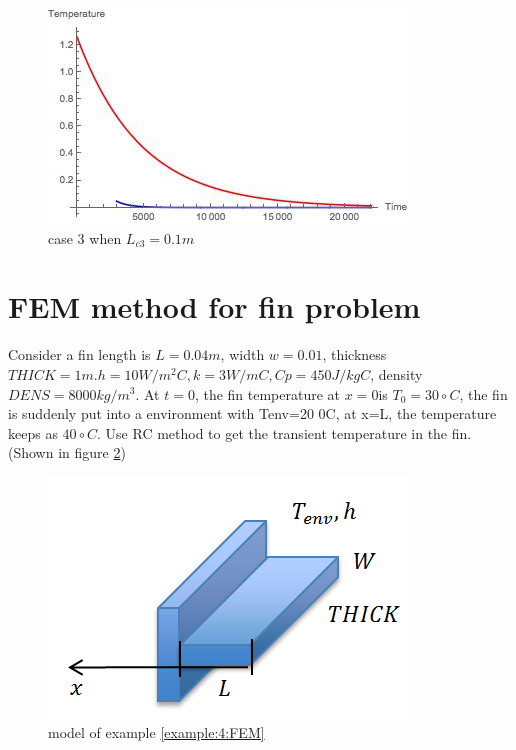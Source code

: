 \begin{solution}
\begin{figure}[h!]
  \centering
    \includegraphics[scale=0.8]{figures/ch4/4}
    \caption{case 3 when $L_{c3}=0.1 m$}
    \label{fig:4:4}
\end{figure}
\end{solution}

\section{FEM method for fin problem}
\begin{example}
\label{example:4:FEM}
Consider a fin length is $L = 0.04 m$, width $w = 0.01$, thickness $THICK = 1 m. h = 10 W/m^2 C, k = 3 W/mC, Cp = 450 J/kg C$,
density $DENS = 8000 kg/m^3$. At $t=0$, the fin temperature at $x=0 $is $T_0=30\circ C$,
the fin is suddenly put into a environment with Tenv=20 0C, at x=L, the temperature keeps as $40\circ C$.
Use RC method to get the transient temperature in the fin. (Shown in figure \ref{fig:4:5})
\begin{figure}[h!]
  \centering
    \includegraphics[scale=0.8]{figures/ch4/5}
    \caption{model of example \ref{example:4:FEM}}
    \label{fig:4:5}
\end{figure}
\end{example}

